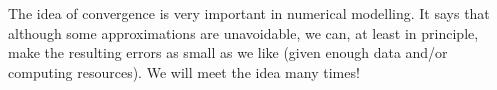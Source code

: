 \noindent
The idea of convergence is very important
in numerical modelling. It says that although some approximations are
unavoidable, we can, at least in principle, make the resulting errors
as small as we like (given enough data and/or computing resources). We
will meet the idea many times!
